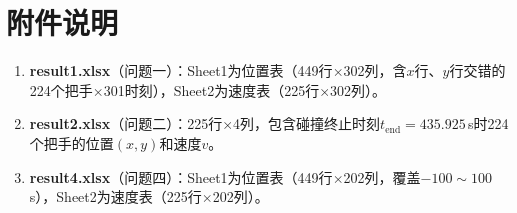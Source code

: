 \documentclass[12pt]{ctexart}
\begin{document}
\section{附件说明}

\begin{enumerate}[label=(\arabic*)]
  \item \textbf{result1.xlsx}（问题一）：Sheet1为位置表（449行$\times$302列，含$x$行、$y$行交错的224个把手$\times$301时刻），Sheet2为速度表（225行$\times$302列）。
  \item \textbf{result2.xlsx}（问题二）：225行$\times$4列，包含碰撞终止时刻$t_{\text{end}}=435.925$\,s时224个把手的位置$(x,y)$和速度$v$。
  \item \textbf{result4.xlsx}（问题四）：Sheet1为位置表（449行$\times$202列，覆盖$-100\sim100$\,s），Sheet2为速度表（225行$\times$202列）。
\end{enumerate}

\FloatBarrier
\end{document}
